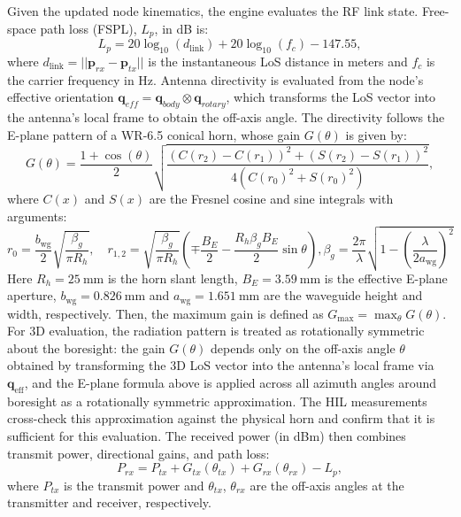 \documentclass[fleqn,10pt]{wlscirep}
\newcommand{\rev}[1]{#1}
\begin{document}
Given the updated node kinematics, the engine evaluates the RF link state. Free-space path loss (FSPL), $L_p$, in dB is:
\begin{equation}
    L_{p} = 20 \log_{10}(d_{\text{link}}) + 20 \log_{10}(f_c) - 147.55,
\end{equation}
where $d_{\text{link}} = ||\mathbf{p}_{rx} - \mathbf{p}_{tx}||$ is the instantaneous LoS distance in meters and $f_c$ is the carrier frequency in Hz. Antenna directivity is evaluated from the node's effective orientation $\mathbf{q}_{eff} = \mathbf{q}_{body} \otimes \mathbf{q}_{rotary}$, which transforms the LoS vector into the antenna's local frame to obtain the off-axis angle. The directivity follows the E-plane pattern of a WR-6.5 conical horn, whose gain $G(\theta)$ is given by:
\begin{equation}
    G(\theta) = \frac{1 + \cos(\theta)}{2} \sqrt{\frac{(C(r_2) - C(r_1))^2 + (S(r_2) - S(r_1))^2}{4(C(r_0)^2 + S(r_0)^2)}},
\end{equation}
where $C(x)$ and $S(x)$ are the Fresnel cosine and sine integrals with arguments:
\begin{equation}
    r_0 = \frac{b_\mathrm{wg}}{2}\sqrt{\frac{\beta_g}{\pi R_h}}, \quad
    r_{1,2} = \sqrt{\frac{\beta_g}{\pi R_h}}\left(\mp\frac{B_E}{2} - \frac{R_h \beta_g B_E}{2}\sin\theta\right),
    \beta_g = \frac{2\pi}{\lambda}\sqrt{1-\left(\frac{\lambda}{2a_\mathrm{wg}}\right)^2}
\end{equation}
Here $R_h = \SI{25}{\milli\meter}$ is the horn slant length, $B_E = \SI{3.59}{\milli\meter}$ is the effective E-plane aperture, $b_\mathrm{wg} = \SI{0.826}{\milli\meter}$ and $a_\mathrm{wg} = \SI{1.651}{\milli\meter}$ are the waveguide height and width, respectively. Then, the maximum gain is defined as $G_\mathrm{max} = \max_{\theta} G(\theta)$. \rev{For 3D evaluation, the radiation pattern is treated as rotationally symmetric about the boresight: the gain $G(\theta)$ depends only on the off-axis angle $\theta$ obtained by transforming the 3D LoS vector into the antenna's local frame via $\mathbf{q}_{\text{eff}}$, and the E-plane formula above is applied across all azimuth angles around boresight as a rotationally symmetric approximation. The HIL measurements cross-check this approximation against the physical horn and confirm that it is sufficient for this evaluation.} The received power (in dBm) then combines transmit power, directional gains, and path loss:
\begin{equation}
P_{rx} = P_{tx} + G_{tx}(\theta_{tx}) + G_{rx}(\theta_{rx}) - L_p,
\end{equation}
where $P_{tx}$ is the transmit power and $\theta_{tx}$, $\theta_{rx}$ are the off-axis angles at the transmitter and receiver, respectively.
\end{document}
